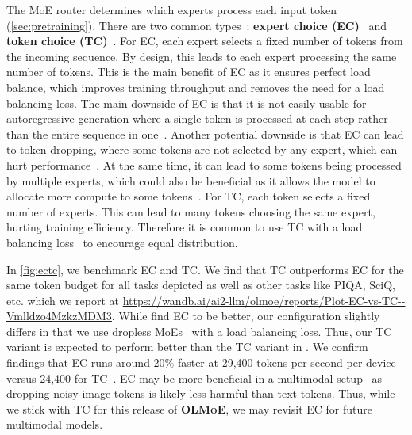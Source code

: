 \documentclass{article}
\newcommand{\model}{\textbf{\textsc{OLMoE}}}
\begin{document}
The MoE router determines which experts process each input token (\autoref{sec:pretraining}). There are two common types~\citep{liu2024routersvisionmixtureexperts}: \textbf{expert choice (EC)}~\citep{zhou2022mixtureofexperts} and \textbf{token choice (TC)}~\citep{shazeer2017outrageously}. For EC, each expert selects a fixed number of tokens from the incoming sequence. By design, this leads to each expert processing the same number of tokens. This is the main benefit of EC as it ensures perfect load balance, which improves training throughput and removes the need for a load balancing loss. The main downside of EC is that it is not easily usable for autoregressive generation where a single token is processed at each step rather than the entire sequence in one~\citep{raposo2024mixtureofdepthsdynamicallyallocatingcompute}. Another potential downside is that EC can lead to token dropping, where some tokens are not selected by any expert, which can hurt performance~\citep{gale2022megablocksefficientsparsetraining}. At the same time, it can lead to some tokens being processed by multiple experts, which could also be beneficial as it allows the model to allocate more compute to some tokens~\citep{zhou2022mixtureofexperts}. For TC, each token selects a fixed number of experts. This can lead to many tokens choosing the same expert, hurting training efficiency. Therefore it is common to use TC with a load balancing loss~\citep{shazeer2017outrageously} to encourage equal distribution.

In \autoref{fig:ectc}, we benchmark EC and TC. We find that TC outperforms EC for the same token budget for all tasks depicted as well as other tasks like PIQA, SciQ, etc. which we report at \url{https://wandb.ai/ai2-llm/olmoe/reports/Plot-EC-vs-TC--Vmlldzo4MzkzMDM3}. While \citet{zhou2022mixtureofexperts} find EC to be better, our configuration slightly differs in that we use dropless MoEs~\citep{gale2022megablocksefficientsparsetraining} with a load balancing loss. Thus, our TC variant is expected to perform better than the TC variant in \citet{zhou2022mixtureofexperts}. We confirm findings that EC runs around 20\% faster at 29,400 tokens per second per device versus 24,400 for TC~\citep{zhou2022mixtureofexperts}. EC may be more beneficial in a multimodal setup~\citep{lin2024momaefficientearlyfusionpretraining} as dropping noisy image tokens is likely less harmful than text tokens. Thus, while \colorbox{lightOlmoeYellow}{we stick with TC for this release of \model{}}, we may revisit EC for future multimodal models.
\end{document}
